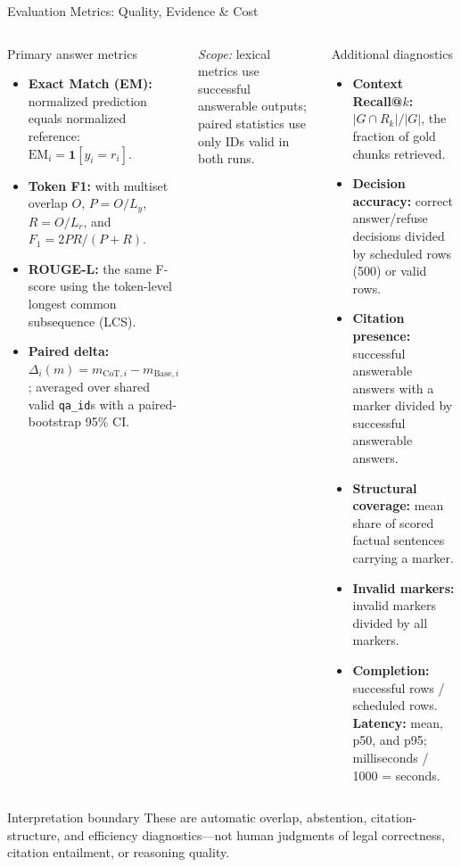\begin{frame}{Evaluation Metrics: Quality, Evidence \& Cost}
\tiny
\setlength{\itemsep}{0.02cm}
\begin{columns}[T,onlytextwidth]
    \begin{block}{Primary answer metrics}
      \begin{itemize}
        \item \textbf{Exact Match (EM):} normalized prediction equals normalized reference:
        \(\mathrm{EM}_i=\mathbf{1}[y_i=r_i]\).
        \item \textbf{Token F1:} with multiset overlap \(O\),
        \(P=O/L_y\), \(R=O/L_r\), and
        \(F_1=2PR/(P+R)\).
        \item \textbf{ROUGE-L:} the same F-score using the token-level longest
        common subsequence (LCS).
        \item \textbf{Paired delta:}
        \(\Delta_i(m)=m_{\mathrm{CoT},i}-m_{\mathrm{Base},i}\);
        averaged over shared valid \texttt{qa\_id}s with a paired-bootstrap
        95\% CI.
      \end{itemize}
    \end{block}
    \vspace{0.04cm}
    \emph{Scope:} lexical metrics use successful answerable outputs; paired
    statistics use only IDs valid in both runs.

    \begin{block}{Additional diagnostics}
      \begin{itemize}
        \item \textbf{Context Recall@$k$:}
        \(\lvert G\cap R_k\rvert/\lvert G\rvert\), the fraction of gold chunks
        retrieved.
        \item \textbf{Decision accuracy:} correct answer/refuse decisions
        divided by scheduled rows (500) or valid rows.
        \item \textbf{Citation presence:} successful answerable answers with a
        marker divided by successful answerable answers.
        \item \textbf{Structural coverage:} mean share of scored factual
        sentences carrying a marker.
        \item \textbf{Invalid markers:} invalid markers divided by all markers.
        \item \textbf{Completion:} successful rows / scheduled rows.
        \textbf{Latency:} mean, p50, and p95; milliseconds / 1000 = seconds.
      \end{itemize}
    \end{block}
\end{columns}
\vspace{0.04cm}
\begin{alertblock}{Interpretation boundary}
These are automatic overlap, abstention, citation-structure, and efficiency
diagnostics---not human judgments of legal correctness, citation entailment, or
reasoning quality.
\end{alertblock}
\end{frame}
